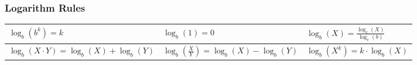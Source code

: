 \documentclass[twoside]{article}
\renewcommand{\arraystretch}{1.5} %
\begin{document}
\subsubsection*{Logarithm Rules}
\vspace{1em}
\sffamily
\bgroup
\def\arraystretch{2}
{\normalsize
\begin{center}
  \begin{tabular}{| >{\centering}m{5cm}| >{\centering}m{5cm}| >{\centering}m{5cm}|}
    \hline
    $\log_b(b^k) = k$
     &
    $\log_b(1) = 0$
     &
    $\log_b(X) = \frac{\log_c(X)}{\log_c(b)}$
    \tabularnewline \hline
    $\log_b(X \cdotp Y) = \log_b(X) + \log_b(Y)$
     &
    $\log_b(\frac{X}{Y}) = \log_b(X) - \log_b(Y)$
     &
    $\log_b(X^k) = k \cdotp \log_b(X)$
    \tabularnewline \hline
  \end{tabular}
\end{center}
}
\egroup
\vspace{1em}
\begin{multicols*}{2}
\end{multicols*}
\end{document}
